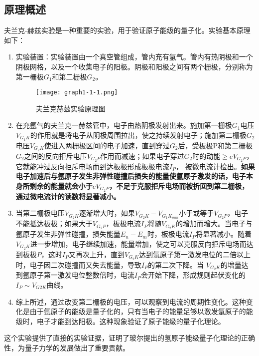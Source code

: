 \documentclass[dvipsnames, svgnames,a4paper,11pt]{article}
\begin{document}
\subsection{原理概述}


	夫兰克-赫兹实验是一种重要的实验，用于验证原子能级的量子化。实验基本原理如下：

	\begin{enumerate}
		\item 实验装置：实验装置由一个真空管组成，管内充有氩气。管内有热阴极和一个阴极网格，以及一个收集电子的阳极。阴极和阳极之间有两个栅极，分别称为第一栅极$G_1$和第二栅极$G_2$。
		
			\begin{figure}[htbp]
				\centering
				\texttt{[image: graph1-1-1.png]}
				\caption{夫兰克赫兹实验原理图}
				\label{fig:graph1-1-1}
			\end{figure}

		\item 在充氩气的夫兰克一赫兹管中，电子由热阴极发射出来。施加第一栅极$G_1$电压$V_{G_1K}$的作用就是将电子从阴极周围拉出，使之持续发射电子；施加第二栅极$G_2$电压$V_{G_2K}$使进入两栅极区间的电子加速，直到穿过$G_2$后，受板极P和第二栅极$G_2$之间的反向拒斥电压$V_{G_2P}$作用而减速；如果电子穿过$G_2$时的动能$\geq eV_{G_2P}$，它就能冲过反向拒斥电场而到达板极形成板极电流$I_P$， 被微电流计检出。\textbf{如果电子加速后与氩原子发生非弹性碰撞后损失的能量使氩原子激发的话，电子本身所剩余的能量就会小于$eV_{G_2P}$，不足于克服拒斥电场而被折回到第二栅极，通过微电流计的读数将显著减小。}
		\item 当第二栅极电压$V_{G_2K}$逐渐增大时，如果$V_{G_2K} - V_{G_1K_{min}}$小于或等于$V_{G_2P}$，电子不能抵达板极；如果大于$V_{G_2P}$，板极电流$I_P$将随$V_{G_2K}$的增加而增大。当电子与氩原子发生非弹性碰撞，损失能量$E_n - E_m$时，板极电流$I_P$将显著减小。随着$V_{G_2K}$进一步增加，电子继续加速，能量增加，使之可以克服反向拒斥电场而达到板极$P$，这时$I_P$又再次上升，直到$V_{G_2K}$达到氩原子第一激发电位的二倍以上时，电子因二次碰撞而又失去能量，导致$I_P$的第二次下降。当 $V_{G_2K}$的增量达到氩原子第一激发电位整数倍时，电流$I_P$会开始下降，形成规则起伏变化的$I_P \sim V_{G2K}$曲线。
		\item 综上所述，通过改变第二栅极的电压，可以观察到电流的周期性变化。这种变化是由于氩原子的能级是量子化的，只有当电子的能量足够以激发氩原子的能级时，电子才能到达阳极。这种现象验证了原子能级的量子化理论。
	\end{enumerate}
	
	这个实验提供了直接的实验证据，证明了玻尔提出的氢原子能级量子化理论的正确性，为量子力学的发展做出了重要贡献。
\end{document}
